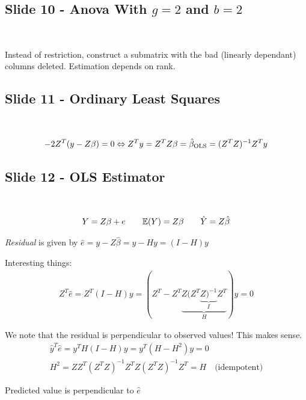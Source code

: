 \subsection{Slide 10 - Anova With $g=2$ and $b=2$}\hfill\\
\par\bigskip
\noindent Instead of restriction, construct a submatrix with the bad (linearly dependant) columns deleted. Estimation depends on rank.
\par\bigskip
\subsection{Slide 11 - Ordinary Least Squares}\hfill\\\par
\begin{equation*}
  \begin{gathered}
    -2Z^T(y-Z\beta) = 0\Leftrightarrow Z^Ty = Z^TZ\beta = \hat{\beta}_{\text{OLS}} = (Z^TZ)^{-1}Z^Ty
  \end{gathered}
\end{equation*}
\par\bigskip
\subsection{Slide 12 - OLS Estimator}\hfill\\\par
\begin{equation*}
  \begin{gathered}
    Y = Z\beta +e \qquad \mathbb{E}(Y) = Z\beta \qquad\hat{Y} = Z\hat{\beta}
  \end{gathered}
\end{equation*}\par
\noindent\textit{Residual} is given by $\hat{e} = y -Z\hat{\beta} = y-Hy = (I-H)y$\par
\noindent Interesting things:
\begin{equation*}
  \begin{gathered}
    Z^T\hat{e} = Z^T(I-H)y = (Z^T-Z^T\underbrace{Z(Z^T\underbrace{Z)^{-1}}_{I}Z^T}_{H})y=0
  \end{gathered}
\end{equation*}
\par\bigskip
\noindent We note that the residual is perpendicular to observed values! This makes sense.
\begin{equation*}
  \begin{gathered}
    \hat{y}^T\hat{e} = y^TH(I-H)y = y^T(H-H^2)y = 0\\
    H^2 = ZZ^T(Z^TZ)^{-1}Z^TZ(Z^TZ)^{-1}Z^T = H \quad\text{(idempotent)}
  \end{gathered}
\end{equation*}
\par\bigskip
\noindent Predicted value is perpendicular to $\hat{e}$
\par\bigskip
